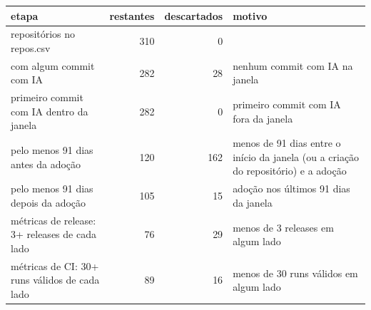 \begin{tabular}{lrrl}
\toprule
etapa & restantes & descartados & motivo \\
\midrule
repositórios no repos.csv & 310 & 0 &  \\
com algum commit com IA & 282 & 28 & nenhum commit com IA na janela \\
primeiro commit com IA dentro da janela & 282 & 0 & primeiro commit com IA fora da janela \\
pelo menos 91 dias antes da adoção & 120 & 162 & menos de 91 dias entre o início da janela (ou a criação do repositório) e a adoção \\
pelo menos 91 dias depois da adoção & 105 & 15 & adoção nos últimos 91 dias da janela \\
métricas de release: 3+ releases de cada lado & 76 & 29 & menos de 3 releases em algum lado \\
métricas de CI: 30+ runs válidos de cada lado & 89 & 16 & menos de 30 runs válidos em algum lado \\
\bottomrule
\end{tabular}
